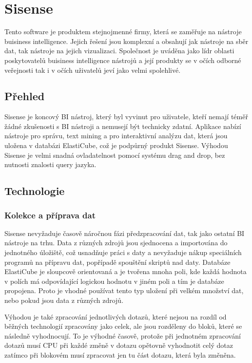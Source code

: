 \documentclass[czech,BP]{thesiskiv}
\begin{document}
 
 \section{Sisense}
  Tento software je produktem stejnojmenné firmy, která se zaměřuje na nástroje buisiness intelligence. Jejich řešení jsou komplexní a obsahují jak nástroje na sběr dat, tak nástroje na jejich vizualizaci. Společnost je uváděna jako lídr oblasti poskytovatelů buisiness intelligence nástrojů a její produkty se v očích odborné veřejnosti tak i v očích uživatelů jeví jako velmi spolehlivé.\cite{SisenseStandings}
 
 \subsection{Přehled}

 Sisense je koncový BI nástroj, který byl vyvinut pro uživatele, kteří nemají téměř žádné zkušenosti s BI nástroji a nemusejí být technicky zdatní. Aplikace nabízí nástroje pro správu, text mining a pro interaktivní analýzu dat, která jsou uložena v databázi ElastiCube, což je podpůrný produkt Sisense. Výhodou Sisense je velmi snadná ovladatelnost pomocí systému drag and drop, bez nutnosti znalosti query jazyka.
 
 \subsection{Technologie}
 \subsubsection{Kolekce a příprava dat}
  Sisense nevyžaduje časově náročnou fázi předzpracování dat, tak jako ostatní BI nástroje na trhu. Data z různých zdrojů jsou sjednocena a importována do jednotného úložiště, což usnadňuje práci s daty a nevyžaduje nákup speciálních programů na přípravu dat, popřípadě spouštění skriptů nad daty. Databáze ElastiCube je sloupcově orientovaná a je tvořena mnoha poli, kde každá hodnota v polích má odpovídající logickou hodnotu v jiném poli a tím je databáze propojena. Proto je vhodné používat tento typ uložení při velkém množství dat, nebo pokud jsou data z různých zdrojů.
  
  
  Výhodou je také zpracování jednotlivých dotazů, které nejsou na rozdíl od běžných technologií zpracovány jako celek, ale jsou rozděleny do bloků, které se následně vyhodnocují. To je výhodné časově, protože při jednotném zpracování dotazů musí CPU při každé změně v dotazu opětovně vyhodnotit celý dotaz zatímco při blokovém musí zpracovat jen tu část dotazu, která byla změněna.\cite{ElasticCube}
  
\end{document}
